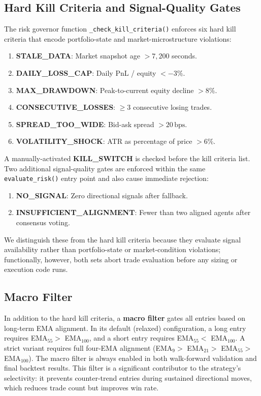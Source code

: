 \documentclass{article}
\newcommand{\bps}{\,\text{bps}}
\begin{document}
\subsection{Hard Kill Criteria and Signal-Quality Gates}

The risk governor function \texttt{\_check\_kill\_criteria()} enforces six hard kill criteria that encode portfolio-state and market-microstructure violations:
\begin{enumerate}[nosep]
  \item \textbf{STALE\_DATA}: Market snapshot age $> 7{,}200$ seconds.
  \item \textbf{DAILY\_LOSS\_CAP}: Daily PnL / equity $< -3\%$.
  \item \textbf{MAX\_DRAWDOWN}: Peak-to-current equity decline $> 8\%$.
  \item \textbf{CONSECUTIVE\_LOSSES}: $\geq 3$ consecutive losing trades.
  \item \textbf{SPREAD\_TOO\_WIDE}: Bid-ask spread $> 20\bps$.
  \item \textbf{VOLATILITY\_SHOCK}: ATR as percentage of price $> 6\%$.
\end{enumerate}

A manually-activated \textbf{KILL\_SWITCH} is checked before the kill criteria list. Two additional signal-quality gates are enforced within the same \texttt{evaluate\_risk()} entry point and also cause immediate rejection:
\begin{enumerate}[nosep, start=7]
  \item \textbf{NO\_SIGNAL}: Zero directional signals after fallback.
  \item \textbf{INSUFFICIENT\_ALIGNMENT}: Fewer than two aligned agents after consensus voting.
\end{enumerate}
We distinguish these from the hard kill criteria because they evaluate signal availability rather than portfolio-state or market-condition violations; functionally, however, both sets abort trade evaluation before any sizing or execution code runs.

\subsection{Macro Filter}

In addition to the hard kill criteria, a \textbf{macro filter} gates all entries based on long-term EMA alignment.
In its default (relaxed) configuration, a long entry requires EMA$_{55} >$ EMA$_{100}$, and a short entry requires EMA$_{55} <$ EMA$_{100}$.
A strict variant requires full four-EMA alignment (EMA$_9 >$ EMA$_{21} >$ EMA$_{55} >$ EMA$_{100}$).
The macro filter is always enabled in both walk-forward validation and final backtest results.
This filter is a significant contributor to the strategy's selectivity: it prevents counter-trend entries during sustained directional moves, which reduces trade count but improves win rate.
\end{document}
